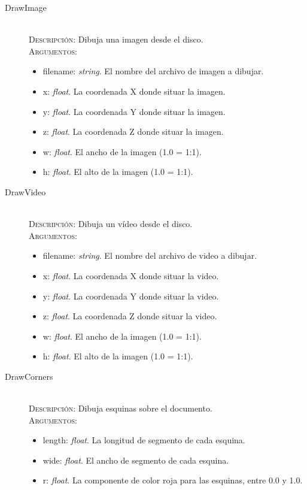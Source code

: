 \begin{description}
\item[DrawImage] \hfill \\
  \textsc{Descripción:} Dibuja una imagen desde el disco. \\
  \textsc{Argumentos:}
  \begin{itemize}
  \item filename: \textit{string}. El nombre del archivo de imagen a dibujar.
  \item x: \textit{float}. La coordenada X donde situar la imagen.
  \item y: \textit{float}. La coordenada Y donde situar la imagen.
  \item z: \textit{float}. La coordenada Z donde situar la imagen.
  \item w: \textit{float}. El ancho de la imagen (1.0 = 1:1).
  \item h: \textit{float}. El alto de la imagen (1.0 = 1:1).
  \end{itemize}
\item[DrawVideo] \hfill \\
  \textsc{Descripción:} Dibuja un vídeo desde el disco. \\
  \textsc{Argumentos:}
  \begin{itemize}
  \item filename: \textit{string}. El nombre del archivo de video a dibujar.
  \item x: \textit{float}. La coordenada X donde situar la video.
  \item y: \textit{float}. La coordenada Y donde situar la video.
  \item z: \textit{float}. La coordenada Z donde situar la video.
  \item w: \textit{float}. El ancho de la imagen (1.0 = 1:1).
  \item h: \textit{float}. El alto de la imagen (1.0 = 1:1).
  \end{itemize}
\item[DrawCorners] \hfill \\
  \textsc{Descripción:} Dibuja esquinas sobre el documento. \\
  \textsc{Argumentos:}
  \begin{itemize}
  \item length: \textit{float}. La longitud de segmento de cada esquina.
  \item wide: \textit{float}. El ancho de segmento de cada esquina.
  \item r: \textit{float}. La componente de color roja para las esquinas, entre 0.0 y 1.0.

\end{itemize}
\end{description}
